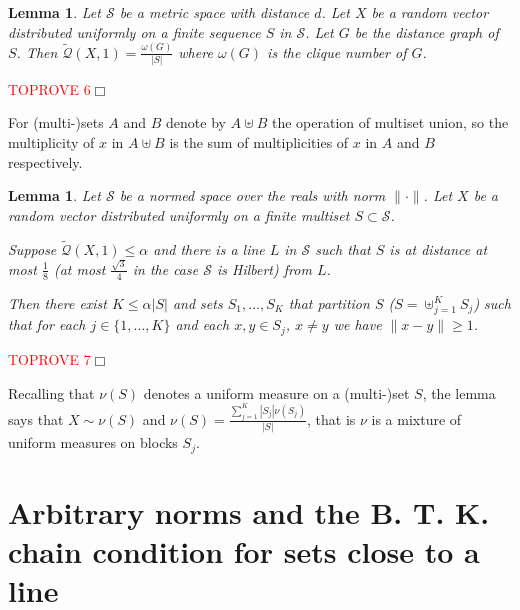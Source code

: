 \documentclass{article}
\newenvironment{proof}{\noindent{\bf Proof}}{\hspace*{\fill}$\Box$}
\newtheorem{lemma} [theorem] {Lemma}\newtheorem{attempt} [theorem] {Attempt}\newtheorem{corollary} [theorem] {Corollary}\newtheorem{prop} [theorem] {Proposition}\newtheorem{definition} [theorem] {Definition}\newtheorem{remark} [theorem] {Remark}\newtheorem{conjecture} [theorem] {Conjecture}\newtheorem{claim} [theorem] {Claim}
\newcommand{\concdiam}{\tilde{\mathcal{Q}}}
\begin{document}
\begin{lemma}\label{lem.cliques} 
    Let $\mathcal{S}$ be a metric space with distance $d$. Let $X$ be a random vector distributed uniformly on a finite sequence $S$ in $\mathcal{S}$. 
    Let $G$ be the distance graph of $S$. Then $\concdiam(X,1) = \frac {\omega(G)} {|S|}$ where $\omega(G)$ is the clique number of $G$.
\end{lemma}

\begin{proof}\textcolor{red}{TOPROVE 6}\end{proof}

\medskip
For (multi-)sets $A$ and $B$ denote by $A \uplus B$ the operation of multiset union, so the multiplicity of $x$
in $A \uplus B$ is the sum of multiplicities of $x$ in $A$ and $B$ respectively.

\begin{lemma}\label{lem.decomposition}
    Let $\mathcal{S}$ be a normed space over the reals with norm $\|\cdot\|$.
Let $X$ be a random vector distributed uniformly on a finite multiset $S \subset \mathcal{S}$.

    Suppose $\concdiam(X, 1) \le \alpha$ and there is a line $L$ in $\mathcal{S}$ such that
    $S$ is at distance at most $\frac 1 8$ (at most $\frac {\sqrt 3} 4$ in the case $\mathcal{S}$ is Hilbert) from $L$.

Then there exist $K \le \alpha |S|$ and
    sets $S_1, \dots, S_K$ that partition $S$ ($S=\uplus_{j=1}^K S_j$) such that
    for each $j \in \{1, \dots, K\}$ and each $x,y \in S_j$, $x \ne y$ we have $\|x - y \| \ge 1$.
\end{lemma}

\begin{proof}\textcolor{red}{TOPROVE 7}\end{proof}

\medskip

Recalling that $\nu(S)$ denotes a uniform measure on a (multi-)set $S$, the lemma says that 
$X \sim \nu(S)$ and $\nu(S) = \frac{\sum_{j=1}^K |S_j| \nu(S_j)} {|S|}$, that is $\nu$ is a
mixture of uniform measures on blocks $S_j$.





\section {Arbitrary norms and the B. T. K. chain condition for sets close to a line}
\label{sec.btk}
\end{document}
